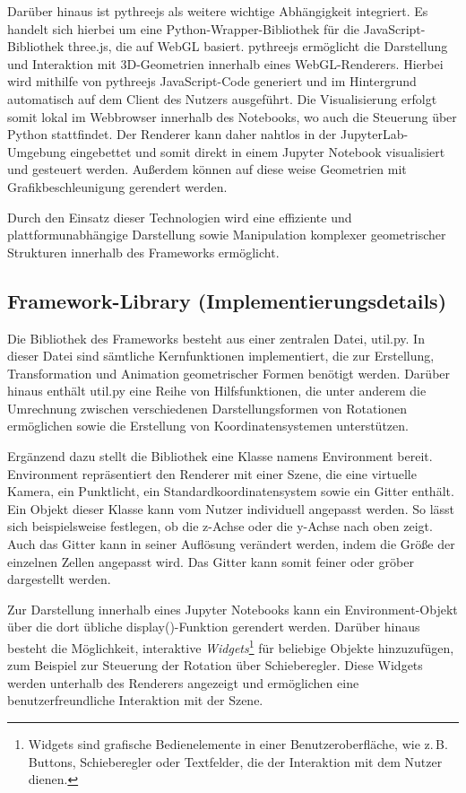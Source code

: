 Darüber hinaus ist pythreejs als weitere wichtige Abhängigkeit integriert.
Es handelt sich hierbei um eine Python-Wrapper-Bibliothek für die JavaScript-Bibliothek three.js, die auf WebGL basiert.
pythreejs ermöglicht die Darstellung und Interaktion mit 3D-Geometrien innerhalb eines WebGL-Renderers.
Hierbei wird mithilfe von pythreejs JavaScript-Code generiert und im Hintergrund automatisch auf dem Client des Nutzers ausgeführt.
Die Visualisierung erfolgt somit lokal im Webbrowser innerhalb des Notebooks, wo auch die Steuerung über Python stattfindet.
Der Renderer kann daher nahtlos in der JupyterLab-Umgebung eingebettet und somit direkt in einem Jupyter Notebook visualisiert und gesteuert werden.
Außerdem können auf diese weise Geometrien mit Grafikbeschleunigung gerendert werden. 

Durch den Einsatz dieser Technologien wird eine effiziente und plattformunabhängige Darstellung sowie Manipulation komplexer
geometrischer Strukturen innerhalb des Frameworks ermöglicht.




\subsection{Framework-Library (Implementierungsdetails)}
Die Bibliothek des Frameworks besteht aus einer zentralen Datei, util.py.
In dieser Datei sind sämtliche Kernfunktionen implementiert, die zur Erstellung, Transformation und Animation geometrischer Formen benötigt werden.
Darüber hinaus enthält util.py eine Reihe von Hilfsfunktionen,
die unter anderem die Umrechnung zwischen verschiedenen Darstellungsformen von Rotationen ermöglichen sowie die Erstellung von Koordinatensystemen unterstützen.

Ergänzend dazu stellt die Bibliothek eine Klasse namens Environment bereit.
Environment repräsentiert den Renderer mit einer Szene, die eine virtuelle Kamera, ein Punktlicht,
ein Standardkoordinatensystem sowie ein Gitter enthält. Ein Objekt dieser Klasse kann vom Nutzer individuell angepasst werden.
So lässt sich beispielsweise festlegen, ob die z-Achse oder die y-Achse nach oben zeigt.
Auch das Gitter kann in seiner Auflösung verändert werden, indem die Größe der einzelnen Zellen angepasst wird.
Das Gitter kann somit feiner oder gröber dargestellt werden.

Zur Darstellung innerhalb eines Jupyter Notebooks kann ein Environment-Objekt über die dort übliche display()-Funktion gerendert werden.
Darüber hinaus besteht die Möglichkeit, interaktive \textit{Widgets}\footnote{Widgets sind grafische Bedienelemente in einer Benutzeroberfläche,
wie z.\,B. Buttons, Schieberegler oder Textfelder, die der Interaktion mit dem Nutzer dienen.} für beliebige Objekte hinzuzufügen, zum Beispiel zur Steuerung der Rotation über Schieberegler.
Diese Widgets werden unterhalb des Renderers angezeigt und ermöglichen eine benutzerfreundliche Interaktion mit der Szene.

